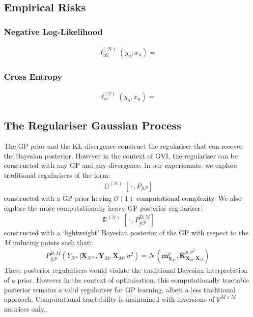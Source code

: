 \documentclass{article}
\newcommand{\D}{\operatorname{\mathbb{D}}}
\newcommand{\GP}{\operatorname{\mathcal{GP}}}
\newcommand{\wc}{\operatorname{{}\cdot{}}}
\numberwithin{equation}{section}
\begin{document}
\subsection{Empirical Risks}
\subsubsection{Negative Log-Likelihood}
\begin{align}
    \ell_{\text{nll}}^{(\mathcal{N})}(y_n, x_n) = 
\end{align}
\subsubsection{Cross Entropy}
\begin{align}
    \ell_{\text{ce}}^{(\mathcal{C})}(y_n, x_n) = 
\end{align}
\subsection{The Regulariser Gaussian Process}
The GP prior and the KL divergence construct the regulariser that can recover the Bayesian posterior. However in the context of GVI, the regulariser can be constructed with any GP and any divergence. In our experiemnts, we explore traditional regularisers of the form:
\begin{align}
    \D^{(\mathcal{N})}\left[\wc, P_{\GP}\right]
    \label{prior-regulariser}
\end{align}
constructed with a GP prior having $\mathcal{O}(1)$ computational complexity. We also explore the more computationally heavy GP posterior regulariser:
\begin{align}
    \D^{(\mathcal{N})}\left[\wc, P^{B, M}_{\GP}\right]
    \label{posterior-regulariser}
\end{align}
constructed with a `lightweight' Bayesian posterior of the GP with respect to the $M$ inducing points such that:
\begin{align}
    P^{B, M}_{\GP}\left(Y_{N*} \vert \mathbf{X}_{N*}, \mathbf{Y}_M, \mathbf{X}_M, \sigma^2\right) = \mathcal{N}\left(\bar{\mathbf{m}}_{\mathbf{X}_M}^p, \bar{\mathbf{K}}_{\mathbf{X}_M, \mathbf{X}_M}^{p, \sigma^2}\right)
\end{align}
These posterior regularisers would violate the traditional Bayesian interpretation of a prior. However in the context of optimisation, this computationally tractable posterior remains a valid regulariser for GP learning, albeit a less traditional approach. Computational tractability is maintained with inversions of $\mathbb{R}^{M\times M}$ matrices only,.
\end{document}
